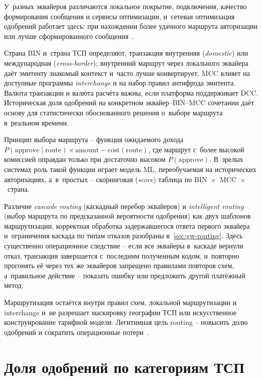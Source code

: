 У~разных эквайеров различаются локальное покрытие, подключения, качество
формирования сообщения и сервисы оптимизации, и~сетевая оптимизация
одобрений работает здесь: при нахождении более удачного маршрута
авторизации или лучше сформированного сообщения~\cite{mc-pop}.

Страна BIN и~страна ТСП определяют, транзакция внутренняя (\textit{domestic})
или международная (\textit{cross-border}); внутренний маршрут через локального
эквайера даёт эмитенту знакомый контекст и~часто лучше конвертирует.
MCC влияет на доступные программы \textit{interchange} и на набор
правил антифрода эмитента. Валюта транзакции и валюта расчёта
важны, если платформа поддерживает DCC. Историческая доля одобрений
на конкретном эквайер--BIN--MCC сочетании даёт основу для
статистически обоснованного решения о~выборе маршрута в~реальном
времени.

Принцип выбора маршрута -- функция ожидаемого дохода
$P(\text{approve} \mid \text{route}) \times \text{amount} -
\text{cost}(\text{route})$, где маршрут с~более высокой комиссией
оправдан только при достаточно высоком $P(\text{approve})$. В~зрелых
системах роль такой функции играет модель ML, переобучаемая на
исторических авторизациях, а~в~простых --
скоринговая (\textit{score}) таблица по
BIN~$\times$~MCC~$\times$~страна.

Различие \textit{cascade routing} (каскадный перебор эквайеров) и
\textit{intelligent routing} (выбор маршрута по предсказанной вероятности
одобрения) как двух шаблонов маршрутизации, корректная обработка
задержавшегося ответа первого эквайера и~ограничения каскада по типам
отказов разобраны в~\autoref{sec:gw-routing}. Здесь существенно операционное следствие --
если все эквайеры в~каскаде вернули отказ, транзакция завершается
с~последним полученным кодом, и~повторно прогонять её через тех же
эквайеров запрещено правилами повторов схем, а~правильное действие --
показать ошибку или предложить другой платёжный метод.

Маршрутизация остаётся внутри правил схем, локальной маршрутизации
и interchange и~не разрешает маскировку географии ТСП
или искусственное конструирование тарифной модели. Легитимная цель routing -- повысить долю одобрений и сократить
операционные потери~\cite{visa-core-rules,mc-rules,mc-tpr}.

\section{Доля одобрений по категориям ТСП}\label{sec:decline-benchmarks}

